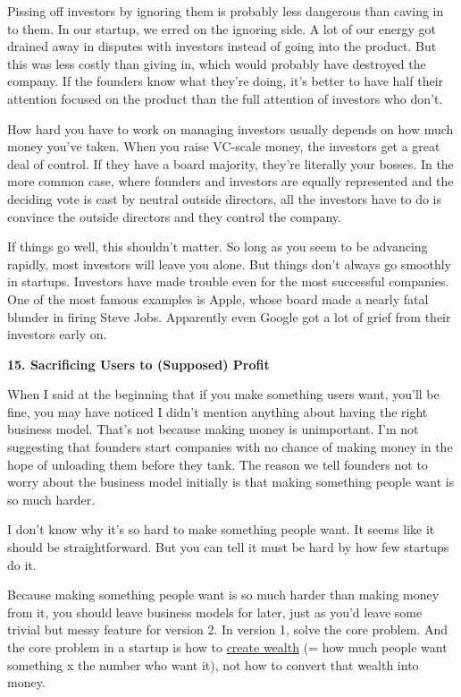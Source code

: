 Pissing off investors by ignoring them is probably less dangerous than
caving in to them. In our startup, we erred on the ignoring side. A lot
of our energy got drained away in disputes with investors instead of
going into the product. But this was less costly than giving in, which
would probably have destroyed the company. If the founders know what
they're doing, it's better to have half their attention focused on the
product than the full attention of investors who don't.

How hard you have to work on managing investors usually depends on how
much money you've taken. When you raise VC-scale money, the investors
get a great deal of control. If they have a board majority, they're
literally your bosses. In the more common case, where founders and
investors are equally represented and the deciding vote is cast by
neutral outside directors, all the investors have to do is convince the
outside directors and they control the company.

If things go well, this shouldn't matter. So long as you seem to be
advancing rapidly, most investors will leave you alone. But things don't
always go smoothly in startups. Investors have made trouble even for the
most successful companies. One of the most famous examples is Apple,
whose board made a nearly fatal blunder in firing Steve Jobs. Apparently
even Google got a lot of grief from their investors early on.

\textbf{15. Sacrificing Users to (Supposed) Profit}

When I said at the beginning that if you make something users want,
you'll be fine, you may have noticed I didn't mention anything about
having the right business model. That's not because making money is
unimportant. I'm not suggesting that founders start companies with no
chance of making money in the hope of unloading them before they tank.
The reason we tell founders not to worry about the business model
initially is that making something people want is so much harder.

I don't know why it's so hard to make something people want. It seems
like it should be straightforward. But you can tell it must be hard by
how few startups do it.

Because making something people want is so much harder than making money
from it, you should leave business models for later, just as you'd leave
some trivial but messy feature for version 2. In version 1, solve the
core problem. And the core problem in a startup is how to
\href{wealth.html}{create wealth} (= how much people want something x
the number who want it), not how to convert that wealth into money.

